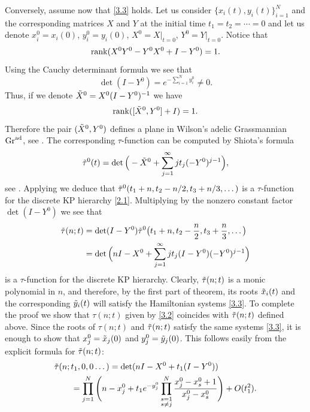 \documentclass[11pt,reqno]{amsart}
\theoremstyle{definition}
\numberwithin{equation}{section}
\begin{document}
Conversely, assume now that \eqref{3.3} holds. Let us consider 
$\{x_i(t),y_i(t)\}_{i=1}^N$ and the corresponding matrices $X$ and $Y$
 at the initial time $t_1=t_2=\cdots=0$ and let us denote 
$x_i^0=x_i(0)$, $y_i^0=y_i(0)$, $X^0=X|_{t=0}$, $Y^0=Y|_{t=0}$. 
Notice that 
\begin{equation*}
\mathrm{rank}(X^0Y^0-Y^0X^0+I-Y^0)=1.
\end{equation*}
Using the Cauchy determinant formula we see that 
\begin{equation*}
\det(I-Y^0)= e^{-\sum_{i=1}^{N}y_i^0} \neq 0.
\end{equation*}
Thus, if we denote ${\tilde{X}}^0=X^0(I-Y^0)^{-1}$ we have
\begin{equation*}
\mathrm{rank}([{\tilde{X}}^0,Y^0]+I)=1.
\end{equation*}
Therefore the pair $({\tilde{X}}^0,Y^0)$ defines a plane in Wilson's adelic 
Grassmannian $\mathrm{Gr}^{\mathrm{ad}}$, see \cite{W2}. The corresponding $\tau$-function 
can be computed by Shiota's formula
\begin{equation*}
{\tilde{\tau}}^0(t)=\det\Big(-{\tilde{X}}^0+\sum_{j=1}^{\infty}jt_j(-Y^0)^{j-1}\Big),
\end{equation*}
see \cite[Corollary 1, p.~5845]{Sh}. 
Applying \cite[Theorem 2.4, p.~290]{HI} we deduce that 
${\tilde{\tau}}^0(t_1+n,t_2-n/2,t_3+n/3,\dots)$ is 
a $\tau$-function for the discrete KP hierarchy \eqref{2.1}. Multiplying 
by the nonzero constant factor $\det(I-Y^0)$ we see that
\begin{equation*}
\begin{split}
{\tilde{\tau}}(n;t)
&=\det(I-Y^0){\tilde{\tau}}^0\big(t_1+n,t_2-\frac{n}{2},t_3+\frac{n}{3},\dots\big)\\
&=\det\Big(nI-X^0+\sum_{j=1}^{\infty}jt_j(I-Y^0)(-Y^0)^{j-1}\Big)
\end{split}
\end{equation*}
is a $\tau$-function for the discrete KP hierarchy. Clearly, ${\tilde{\tau}}(n;t)$ 
is a monic polynomial in $n$, and therefore, by the first part of theorem, its 
roots ${\tilde{x}}_i(t)$ and the corresponding ${\tilde{y}}_i(t)$ will 
satisfy the Hamiltonian systems \eqref{3.3}. 
To complete the proof we show that 
$\tau(n;t)$ given by \eqref{3.2} coincides with ${\tilde{\tau}}(n;t)$ defined 
above. Since the roots of $\tau(n;t)$ and ${\tilde{\tau}}(n;t)$
satisfy the same systems \eqref{3.3}, 
it is enough to show that $x_j^0={\tilde{x}}_j(0)$ and $y_j^0={\tilde{y}}_j(0)$.
This follows easily from the explicit formula for ${\tilde{\tau}}(n;t)$:
\begin{align*}
&{\tilde{\tau}}(n;t_1,0,0\dots)=\det(nI-X^0+t_1(I-Y^0))\\
&\qquad=\prod_{j=1}^N\Bigg(n-x_j^0+t_1e^{-y_j^0}
\prod_{\begin{subarray}{c}s=1 \\s\neq j\end{subarray}}^N
\frac{x_j^0-x_s^0+1}{x_j^0-x_s^0}\Bigg)+O(t_1^2).
\end{align*}
\end{document}
